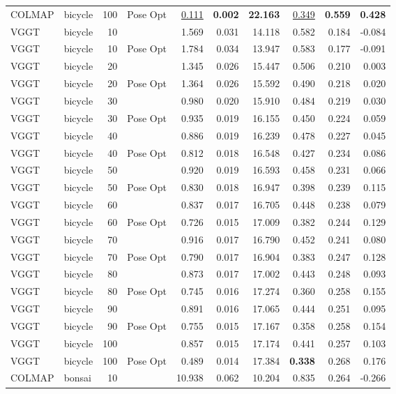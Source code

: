 \begin{table}[H]
\begin{tabular}{llrlrrrrrr}
COLMAP & bicycle & 100 & Pose Opt & \underline{0.111} & \textbf{0.002} & \textbf{22.163} & \underline{0.349} & \textbf{0.559} & \textbf{0.428} \\
VGGT & bicycle & 10 &  & 1.569 & 0.031 & 14.118 & 0.582 & 0.184 & -0.084 \\
VGGT & bicycle & 10 & Pose Opt & 1.784 & 0.034 & 13.947 & 0.583 & 0.177 & -0.091 \\
VGGT & bicycle & 20 &  & 1.345 & 0.026 & 15.447 & 0.506 & 0.210 & 0.003 \\
VGGT & bicycle & 20 & Pose Opt & 1.364 & 0.026 & 15.592 & 0.490 & 0.218 & 0.020 \\
VGGT & bicycle & 30 &  & 0.980 & 0.020 & 15.910 & 0.484 & 0.219 & 0.030 \\
VGGT & bicycle & 30 & Pose Opt & 0.935 & 0.019 & 16.155 & 0.450 & 0.224 & 0.059 \\
VGGT & bicycle & 40 &  & 0.886 & 0.019 & 16.239 & 0.478 & 0.227 & 0.045 \\
VGGT & bicycle & 40 & Pose Opt & 0.812 & 0.018 & 16.548 & 0.427 & 0.234 & 0.086 \\
VGGT & bicycle & 50 &  & 0.920 & 0.019 & 16.593 & 0.458 & 0.231 & 0.066 \\
VGGT & bicycle & 50 & Pose Opt & 0.830 & 0.018 & 16.947 & 0.398 & 0.239 & 0.115 \\
VGGT & bicycle & 60 &  & 0.837 & 0.017 & 16.705 & 0.448 & 0.238 & 0.079 \\
VGGT & bicycle & 60 & Pose Opt & 0.726 & 0.015 & 17.009 & 0.382 & 0.244 & 0.129 \\
VGGT & bicycle & 70 &  & 0.916 & 0.017 & 16.790 & 0.452 & 0.241 & 0.080 \\
VGGT & bicycle & 70 & Pose Opt & 0.790 & 0.017 & 16.904 & 0.383 & 0.247 & 0.128 \\
VGGT & bicycle & 80 &  & 0.873 & 0.017 & 17.002 & 0.443 & 0.248 & 0.093 \\
VGGT & bicycle & 80 & Pose Opt & 0.745 & 0.016 & 17.274 & 0.360 & 0.258 & 0.155 \\
VGGT & bicycle & 90 &  & 0.891 & 0.016 & 17.065 & 0.444 & 0.251 & 0.095 \\
VGGT & bicycle & 90 & Pose Opt & 0.755 & 0.015 & 17.167 & 0.358 & 0.258 & 0.154 \\
VGGT & bicycle & 100 &  & 0.857 & 0.015 & 17.174 & 0.441 & 0.257 & 0.103 \\
VGGT & bicycle & 100 & Pose Opt & 0.489 & 0.014 & 17.384 & \textbf{0.338} & 0.268 & 0.176 \\
\midrule
COLMAP & bonsai & 10 &  & 10.938 & 0.062 & 10.204 & 0.835 & 0.264 & -0.266 \\

\end{tabular}
\end{table}
